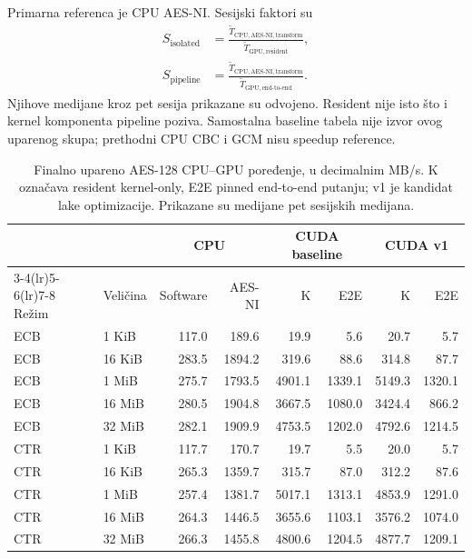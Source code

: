 Primarna referenca je CPU AES-NI. Sesijski faktori su
\begin{equation}
\begin{aligned}
S_{\mathrm{isolated}} & =
\frac{\widetilde{T}_{\mathrm{CPU,AES\mbox{-}NI,transform}}}
     {\widetilde{T}_{\mathrm{GPU,resident}}}, \\
S_{\mathrm{pipeline}} & =
\frac{\widetilde{T}_{\mathrm{CPU,AES\mbox{-}NI,transform}}}
     {\widetilde{T}_{\mathrm{GPU,end\mbox{-}to\mbox{-}end}}}.
\end{aligned}
\label{eq:gpu-cpu-ubrzanje}
\end{equation}
Njihove medijane kroz pet sesija prikazane su odvojeno. Resident nije
isto što i kernel komponenta pipeline poziva. Samostalna baseline tabela
nije izvor ovog uparenog skupa; prethodni CPU CBC i GCM nisu speedup reference.

\begin{table}[htbp]
\centering
\small
\setlength{\tabcolsep}{3pt}
\caption{Finalno upareno AES-128 CPU--GPU poređenje, u decimalnim MB/s.
K označava resident kernel-only, E2E pinned end-to-end putanju; v1 je
kandidat lake optimizacije. Prikazane su medijane pet sesijskih medijana.}
\label{tab:cpu-gpu-final-comparison}
\begin{tabular}{llrrrrrr}
\toprule
 & & \multicolumn{2}{c}{CPU} & \multicolumn{2}{c}{CUDA baseline} & \multicolumn{2}{c}{CUDA v1} \\
\cmidrule(lr){3-4}\cmidrule(lr){5-6}\cmidrule(lr){7-8}
Režim & Veličina & Software & AES-NI & K & E2E & K & E2E \\
\midrule
ECB & 1 KiB & 117.0 & 189.6 & 19.9 & 5.6 & 20.7 & 5.7 \\
ECB & 16 KiB & 283.5 & 1894.2 & 319.6 & 88.6 & 314.8 & 87.7 \\
ECB & 1 MiB & 275.7 & 1793.5 & 4901.1 & 1339.1 & 5149.3 & 1320.1 \\
ECB & 16 MiB & 280.5 & 1904.8 & 3667.5 & 1080.0 & 3424.4 & 866.2 \\
ECB & 32 MiB & 282.1 & 1909.9 & 4753.5 & 1202.0 & 4792.6 & 1214.5 \\
\midrule
CTR & 1 KiB & 117.7 & 170.7 & 19.7 & 5.5 & 20.0 & 5.7 \\
CTR & 16 KiB & 265.3 & 1359.7 & 315.7 & 87.0 & 312.2 & 87.6 \\
CTR & 1 MiB & 257.4 & 1381.7 & 5017.1 & 1313.1 & 4853.9 & 1291.0 \\
CTR & 16 MiB & 264.3 & 1446.5 & 3655.6 & 1103.1 & 3576.2 & 1074.0 \\
CTR & 32 MiB & 266.3 & 1455.8 & 4800.6 & 1204.5 & 4877.7 & 1209.1 \\
\bottomrule
\end{tabular}
\end{table}

